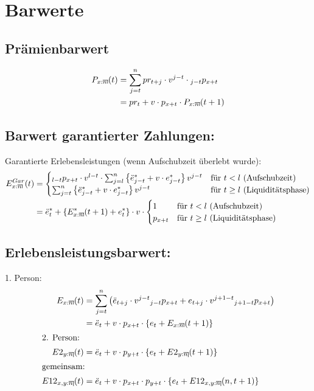 \documentclass[a4paper,10pt]{article}
\makeatletter
\DeclareRobustCommand{\act}[2][]{%
\def\arraystretch{0}%
\setlength\arraycolsep{0.5pt}%
\setlength\arrayrulewidth{0.5pt}%
\setbox0=\hbox{$\scriptstyle#1\ifx#1\empty{asdf}\else:\fi#2$}%
\begin{array}[b]{*2{@{}>{\scriptstyle}c}|}
\cline{2-2}%
\rule[1.25pt]{0pt}{\ht0}%
#1\ifx#1\empty\else:\fi & #2%
\end{array}%
}
\makeatother
\begin{document}
\pagebreak

\section{Barwerte}

\subsection{Prämienbarwert}

\begin{align*} 
P_{\act[x]{n}}(t) &= \sum_{j=t}^n pr_{t+j} \cdot v^{j-t}  \cdot {}_{j-t}p_{x+t}\\
	  &= pr_{t} + v \cdot p_{x+t} \cdot P_{\act[x]{n}}(t+1)
\end{align*}

\subsection{Barwert garantierter Zahlungen:}
Garantierte Erlebensleistungen (wenn Aufschubzeit überlebt wurde):
\begin{align*} 
 E^{Gar}_{\act[x]{n}}(t) &= \begin{cases}
		    {}_{l-t}p_{x+t} \cdot v^{l-t} \cdot \sum_{j=l}^{n} \left\{\ddot{e}^{*}_{j-t}+ v\cdot e^*_{j-t}\right\} v^{j-t} & \text{für $t<l$ (Aufschubzeit)}\\
		    \sum_{j=t}^{n} \left\{\ddot{e}^{*}_{j-t}+ v\cdot e^*_{j-t}\right\} v^{j-t} & \text{für $t\ge l$ (Liquiditätsphase)}
                 \end{cases}\\
   &= \ddot{e}_t^{*} + \left\{E^{*}_{\act[x]{n}}(t+1) + e_t^*\right\}\cdot v \cdot \begin{cases}
	    1 & \text{für $t<l$ (Aufschubzeit)}\\
            p_{x+t} & \text{für $t\ge l$ (Liquiditätsphase)}
       \end{cases}
\end{align*}


\subsection{Erlebensleistungsbarwert:}
1. Person:
\begin{align*} 
E_{\act[x]{n}}(t) &= \sum_{j=t}^n \left(\ddot{e}_{t+j} \cdot v^{j-t}  {}_{j-t}p_{x+t} + e_{t+j} \cdot v^{j+1-t} {}_{j+1-t}p_{x+t} \right)\\
	  &= \ddot{e}_{t} + v \cdot p_{x+t} \cdot \left\{ e_t + E_{\act[x]{n}}(t+1)\right\}\\
\intertext{2. Person:}
E2_{\act[y]{n}}(t) &= \ddot{e}_{t} + v \cdot p_{y+t} \cdot \left\{ e_t + E2_{\act[y]{n}}(t+1)\right\}\\
\intertext{gemeinsam:}
E12_{\act[x,y]{n}}(t) &= \ddot{e}_{t} + v \cdot p_{x+t} \cdot p_{y+t} \cdot \left\{ e_t + E12_{\act[x,y]{n}}(n,t+1)\right\}\\
\end{align*}
\end{document}
